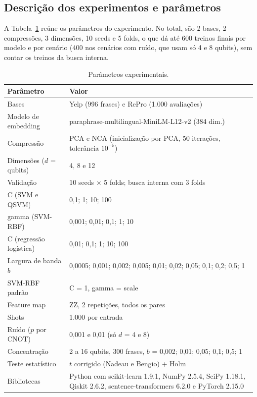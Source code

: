 \documentclass[conference]{IEEEtran}
\newcommand{\svm}{\mbox{SVM-RBF}}
\begin{document}
\subsection{Descrição dos experimentos e parâmetros}
A Tabela~\ref{tab:parametros} reúne os parâmetros do experimento. No total, são 2 bases, 2 compressões, 3 dimensões, 10 seeds e 5 folds, o que dá até 600 treinos finais por modelo e por cenário (400 nos cenários com ruído, que usam só 4 e 8 qubits), sem contar os treinos da busca interna.

\begin{table}[t]
\centering
\caption{Parâmetros experimentais.}
\label{tab:parametros}
\footnotesize
\begin{tabular}{p{}p{}}
\toprule
Parâmetro & Valor \\
\midrule
Bases & Yelp (996 frases) e RePro (1.000 avaliações) \\
Modelo de embedding & paraphrase-multilingual-MiniLM-L12-v2 (384 dim.) \\
Compressão & PCA e NCA (inicialização por PCA, 50 iterações, tolerância $10^{-5}$) \\
Dimensões ($d$ = qubits) & 4, 8 e 12 \\
Validação & 10 seeds $\times$ 5 folds; busca interna com 3 folds \\
C (SVM e QSVM) & 0,1; 1; 10; 100 \\
gamma (\svm{}) & 0,001; 0,01; 0,1; 1; 10 \\
C (regressão logística) & 0,01; 0,1; 1; 10; 100 \\
Largura de banda $b$ & 0,0005; 0,001; 0,002; 0,005; 0,01; 0,02; 0,05; 0,1; 0,2; 0,5; 1 \\
\svm{} padrão & C = 1, gamma = scale \\
Feature map & ZZ, 2 repetições, todos os pares \\
Shots & 1.000 por entrada \\
Ruído ($p$ por CNOT) & 0,001 e 0,01 (só $d$ = 4 e 8) \\
Concentração & 2 a 16 qubits, 300 frases, $b$ = 0,002; 0,01; 0,05; 0,1; 0,5; 1 \\
Teste estatístico & $t$ corrigido (Nadeau e Bengio) + Holm \\
Bibliotecas & Python com scikit-learn 1.9.1, NumPy 2.5.4, SciPy 1.18.1, Qiskit 2.6.2, sentence-transformers 6.2.0 e PyTorch 2.15.0 \\
\bottomrule
\end{tabular}
\end{table}
\end{document}
